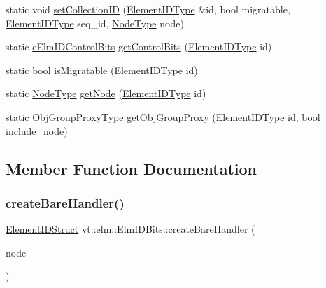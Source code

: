 \begin{DoxyCompactItemize}
\item 
static void \hyperlink{structvt_1_1elm_1_1_elm_i_d_bits_abb1902f29d879e417ed307409a7a185f}{set\+Collection\+ID} (\hyperlink{namespacevt_1_1elm_a63afb64985b41b7b6dcf2f01336391f8}{Element\+I\+D\+Type} \&id, bool migratable, \hyperlink{namespacevt_1_1elm_a63afb64985b41b7b6dcf2f01336391f8}{Element\+I\+D\+Type} seq\+\_\+id, \hyperlink{namespacevt_a866da9d0efc19c0a1ce79e9e492f47e2}{Node\+Type} node)
\item 
static \hyperlink{namespacevt_1_1elm_a38258bcd01ff9b6e184a30afdd3a7df2}{e\+Elm\+I\+D\+Control\+Bits} \hyperlink{structvt_1_1elm_1_1_elm_i_d_bits_afa59deb00015d8e129df071fef81bf10}{get\+Control\+Bits} (\hyperlink{namespacevt_1_1elm_a63afb64985b41b7b6dcf2f01336391f8}{Element\+I\+D\+Type} id)
\item 
static bool \hyperlink{structvt_1_1elm_1_1_elm_i_d_bits_ae810641222649bdcbc9fec15b72216a7}{is\+Migratable} (\hyperlink{namespacevt_1_1elm_a63afb64985b41b7b6dcf2f01336391f8}{Element\+I\+D\+Type} id)
\item 
static \hyperlink{namespacevt_a866da9d0efc19c0a1ce79e9e492f47e2}{Node\+Type} \hyperlink{structvt_1_1elm_1_1_elm_i_d_bits_ab5b9aef3adc1f6387e661d5eaa895cfb}{get\+Node} (\hyperlink{namespacevt_1_1elm_a63afb64985b41b7b6dcf2f01336391f8}{Element\+I\+D\+Type} id)
\item 
static \hyperlink{namespacevt_ad7cae989df485fccca57f0792a880a8e}{Obj\+Group\+Proxy\+Type} \hyperlink{structvt_1_1elm_1_1_elm_i_d_bits_a6f20a7ca1e4c0f03bd10d349fb1b60c7}{get\+Obj\+Group\+Proxy} (\hyperlink{namespacevt_1_1elm_a63afb64985b41b7b6dcf2f01336391f8}{Element\+I\+D\+Type} id, bool include\+\_\+node)
\end{DoxyCompactItemize}


\subsection{Member Function Documentation}
\mbox{\label{structvt_1_1elm_1_1_elm_i_d_bits_a7c43226050fef30c9aac216ba33051b5}} 
\subsubsection{\texorpdfstring{create\+Bare\+Handler()}{createBareHandler()}}
{\footnotesize\ttfamily \hyperlink{structvt_1_1elm_1_1_element_i_d_struct}{Element\+I\+D\+Struct} vt\+::elm\+::\+Elm\+I\+D\+Bits\+::create\+Bare\+Handler (\begin{DoxyParamCaption}\item[{\hyperlink{namespacevt_a866da9d0efc19c0a1ce79e9e492f47e2}{Node\+Type}}]{node }\end{DoxyParamCaption})\hspace{0.3cm}{\ttfamily [static]}}

